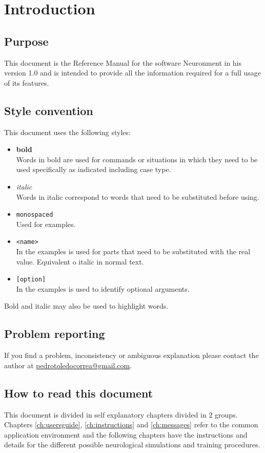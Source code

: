 \chapter{Introduction}
\label{ch:introduction}

\section{Purpose}

This document is the Reference Manual for the software Neuronment in his version 1.0 and is intended to provide
all the information required for a full usage of its features.

\section{Style convention}

This document uses the following styles:
\begin{itemize}
  \item \textbf{bold}\\  
  Words in bold are used for commands or situations in which they need to be used specifically as indicated including case type.
  \item \textit{italic}\\  
  Words in italic correspond to words that need to be substituted before using.
  \item \texttt{monospaced}\\  
  Used for examples.
  \item \texttt{<name>}\\  
  In the examples is used for parts that need to be substituted with the real value. Equivalent o italic in normal text.
  \item \texttt{[option]}\\
  In the examples is used to identify optional arguments.
\end{itemize}

Bold and italic may also be used to highlight words.

\section{Problem reporting}

If you find a problem, inconsistency or ambiguous explanation please contact the author at \href{mailto:pedrotoledocorrea@gmail.com}{pedrotoledocorrea@gmail.com}.

\section{How to read this document}

This document is divided in self explanatory chapters divided in 2 groups. Chapters \ref{ch:usersguide}, \ref{ch:instructions} and \ref{ch:messages} refer to the common application environment and the following chapters have the instructions and details for the different possible neurological simulations and training procedures.

\newpage